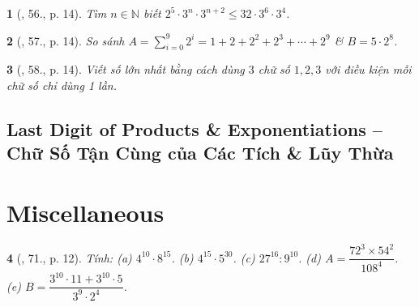 \documentclass{article}
\newtheorem{baitoan}{}
\begin{document}
\begin{baitoan}[\cite{Tuyen_Toan_6}, 56., p. 14]
	Tìm $n\in\mathbb{N}$ biết $2^5\cdot3^n\cdot3^{n + 2}\le32\cdot3^6\cdot3^4$.
\end{baitoan}

\begin{baitoan}[\cite{Tuyen_Toan_6}, 57., p. 14]
	So sánh $A = \sum_{i=0}^9 2^i = 1 + 2 + 2^2 + 2^3 + \cdots + 2^9$ \& $B = 5\cdot2^8$.
\end{baitoan}

\begin{baitoan}[\cite{Tuyen_Toan_6}, 58., p. 14]
	Viết số lớn nhất bằng cách dùng $3$ chữ số $1,2,3$ với điều kiện mỗi chữ số chỉ dùng 1 lần.
\end{baitoan}


\subsection{Last Digit of Products \& Exponentiations -- Chữ Số Tận Cùng của Các Tích \& Lũy Thừa}


\section{Miscellaneous}




\begin{baitoan}[\cite{Binh_Toan_6_tap_1}, 71., p. 12]
	Tính: (a) $4^{10}\cdot8^{15}$. (b) $4^{15}\cdot5^{30}$. (c) $27^{16}:9^{10}$. (d) $A = \dfrac{72^3\times54^2}{108^4}$. (e) $B = \dfrac{3^{10}\cdot11 + 3^{10}\cdot5}{3^9\cdot2^4}$.
\end{baitoan}



\printbibliography[heading=bibintoc]
\end{document}
